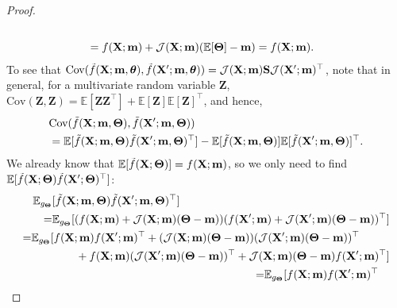 \begin{appendices}
\begin{proof}
\begin{align}
\begin{split}
    \\
    &
    = f(\mathbf X ; \mathbf{m}) + \mathcal{J}(\mathbf X ; \mathbf{m})(\mathbb{E}[\boldsymbol{\Theta}] - \mathbf{m})
    = f(\mathbf X ; \mathbf{m}).
\end{split}
\end{align}
To see that $\textrm{Cov}(\smash{\tilde{f}}(\mathbf X ; \mathbf{m}, {\boldsymbol{\theta}}), \smash{\tilde{f}}(\mathbf X'; \mathbf{m}, {\boldsymbol{\theta}})) = \mathcal{J}(\mathbf X ; \mathbf{m}) \mathbf{S} \mathcal{J}(\mathbf X' ; \mathbf{m})^\top$, note that in general, for a multivariate random variable $\mathbf{Z}$, $\textrm{Cov}(\mathbf{Z}, \mathbf{Z}) = \mathbb{E}[\mathbf{Z} \mathbf{Z}^\top] + \mathbb{E}[\mathbf{Z}] \mathbb{E}[\mathbf{Z}]^\top$, and hence,
\begin{align}
\begin{split}
    &
    \textrm{Cov}(\smash{\tilde{f}}(\mathbf X ; \mathbf{m}, \boldsymbol{\Theta}), \smash{\tilde{f}}(\mathbf X'; \mathbf{m}, \boldsymbol{\Theta}))
    \\
    &
    =
    \mathbb{E}[ \smash{\tilde{f}}(\mathbf X ; \mathbf{m}, \boldsymbol{\Theta}) \smash{\tilde{f}}(\mathbf X'; \mathbf{m}, \boldsymbol{\Theta})^\top ] - \mathbb{E}[\smash{\tilde{f}}(\mathbf X ; \mathbf{m}, \boldsymbol{\Theta})] \mathbb{E}[\smash{\tilde{f}}(\mathbf X'; \mathbf{m}, \boldsymbol{\Theta})]^\top.
\end{split}
\end{align}
We already know that  $\mathbb{E}[\smash{\tilde{f}}(\mathbf X ; \boldsymbol{\Theta})] = f(\mathbf X ; \mathbf{m})$, so we only need to find $\mathbb{E}[ \smash{\tilde{f}}(\mathbf X ; \boldsymbol{\Theta}) \smash{\tilde{f}}(\mathbf X'; \boldsymbol{\Theta})^\top ]$:
\begin{align}
    \begin{split}
    \mathbb{E}_{g_{\bTheta}}&[ \flin(\bX ; \mathbf{m}, \bTheta) \flin(\bX'; \mathbf{m}, \bTheta)^\top ]
    \\
    =
    &\mathbb{E}_{g_{\bTheta}}[ (f(\bX ; \mathbf{m}) + \jac(\bX ; \mathbf{m})(\bTheta - \mathbf{m})) (f(\bX'; \mathbf{m}) + \jac(\bX' ; \mathbf{m})(\bTheta - \mathbf{m}))^\top ]
    \end{split}
    \\
    \begin{split}
    =
    &\mathbb{E}_{g_{\bTheta}}[ f(\bX ; \mathbf{m}) f(\bX' ; \mathbf{m})^\top 
    + 
    (\jac(\bX ; \mathbf{m})(\bTheta - \mathbf{m})) (\jac(\bX' ; \mathbf{m})(\bTheta - \mathbf{m}))^\top
    \\
    &\qquad \qquad + f(\bX ; \mathbf{m}) (\jac(\bX' ; \mathbf{m})(\bTheta - \mathbf{m}))^\top
    + \jac(\bX ; \mathbf{m})(\bTheta - \mathbf{m}) f(\bX' ; \mathbf{m})^\top ]
    \end{split}
    \\
    \begin{split}
    =
    &\mathbb{E}_{g_{\bTheta}}[ f(\bX ; \mathbf{m}) f(\bX' ; \mathbf{m})^\top 

\end{split}
\end{align}
\end{proof}
\end{appendices}
